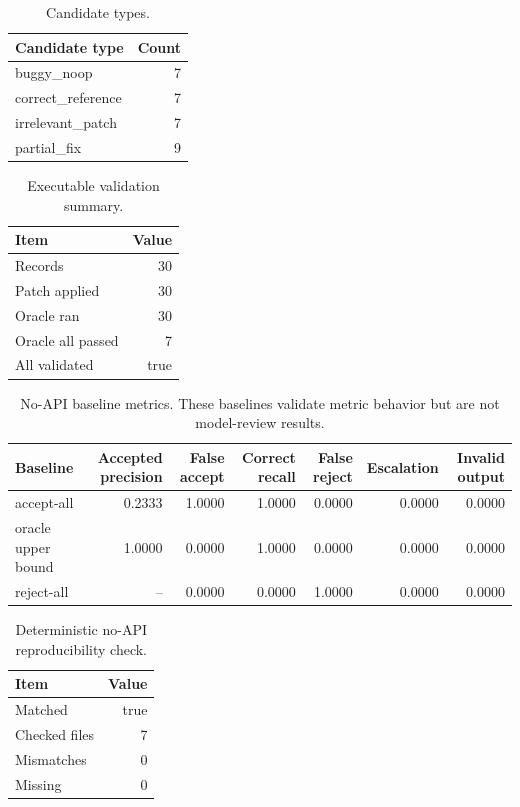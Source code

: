 \documentclass[conference]{IEEEtran}
\begin{document}
\begin{table}[t]
\centering
\caption{Candidate types.}
\label{tab:candidate-types}
\begin{tabular}{lr}
\toprule
Candidate type & Count \\
\midrule
buggy\_noop & 7 \\
correct\_reference & 7 \\
irrelevant\_patch & 7 \\
partial\_fix & 9 \\
\bottomrule
\end{tabular}
\end{table}


\begin{table}[t]
\centering
\caption{Executable validation summary.}
\label{tab:validation-summary}
\begin{tabular}{lr}
\toprule
Item & Value \\
\midrule
Records & 30 \\
Patch applied & 30 \\
Oracle ran & 30 \\
Oracle all passed & 7 \\
All validated & true \\
\bottomrule
\end{tabular}
\end{table}


\begin{table}[t]
\centering
\caption{No-API baseline metrics. These baselines validate metric behavior but are not model-review results.}
\label{tab:no-api-baselines}
\begin{tabular}{lrrrrrr}
\toprule
Baseline & Accepted precision & False accept & Correct recall & False reject & Escalation & Invalid output \\
\midrule
accept-all & 0.2333 & 1.0000 & 1.0000 & 0.0000 & 0.0000 & 0.0000 \\
oracle upper bound & 1.0000 & 0.0000 & 1.0000 & 0.0000 & 0.0000 & 0.0000 \\
reject-all & -- & 0.0000 & 0.0000 & 1.0000 & 0.0000 & 0.0000 \\
\bottomrule
\end{tabular}
\end{table}


\begin{table}[t]
\centering
\caption{Deterministic no-API reproducibility check.}
\label{tab:reproducibility}
\begin{tabular}{lr}
\toprule
Item & Value \\
\midrule
Matched & true \\
Checked files & 7 \\
Mismatches & 0 \\
Missing & 0 \\
\bottomrule
\end{tabular}
\end{table}
\end{document}
